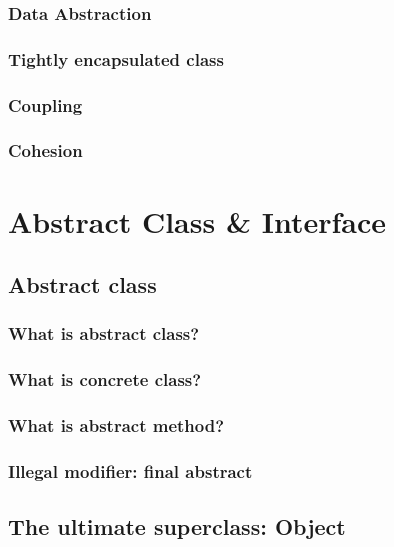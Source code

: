 \documentclass[14pt,fleqn]{extbook} %
\begin{document}
\subsection{Data Abstraction}

\subsection{Tightly encapsulated class}

\subsection{Coupling}

\subsection{Cohesion}


\chapter{Abstract Class \& Interface}
\section{Abstract class}
%
\subsection{What is abstract class?}

\subsection{What is concrete class?}

\subsection{What is abstract method?}

\subsection{Illegal modifier: final abstract}

\section{The ultimate superclass: Object}

%
\end{document}
